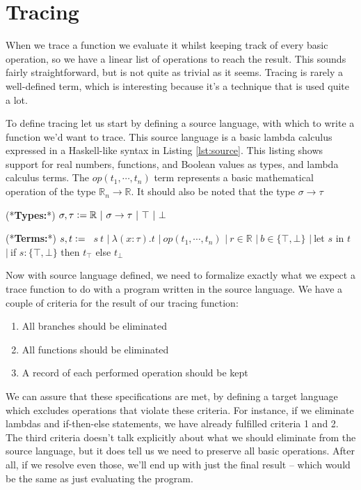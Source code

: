 \section{Tracing}
    When we trace a function we evaluate it whilst keeping track of every basic operation, so we have a linear list of operations to reach the result.
    This sounds fairly straightforward, but is not quite as trivial as it seems.
    Tracing is rarely a well-defined term, which is interesting because it's a technique that is used quite a lot.

    To define tracing let us start by defining a source language, with which to write a function we'd want to trace.
    This source language is a basic lambda calculus expressed in a Haskell-like syntax in Listing \ref{lst:source}.
    This listing shows support for real numbers, functions, and Boolean values as types, and lambda calculus terms.
    The $op(t_1,\dotsb,t_n)$ term represents a basic mathematical operation of the type $\mathbb{R}_n\to\mathbb{R}$.
    It should also be noted that the type $\sigma\to\tau$

    \begin{deflisting}[caption={Source language},label=lst:source]
    (*\textbf{Types:}*)
        $\sigma,\tau\deq\mathbb{R}\ |\ \sigma\to\tau\ |\ \top\ |\ \bot$

    (*\textbf{Terms:}*)
        $s,t\deq$
        $\ \ s\ t$
        $|\ \lambda(x:\tau).t$
        $|\ op(t_1,\dotsb,t_n)$
        $|\ r\in\mathbb{R}$
        $|\ b\in\{\top,\bot\}$
        $|\ $let $s$ in $t$
        $|\ $if $s:\{\top,\bot\}$ then $t_\top$ else $t_\bot$
    \end{deflisting}

    Now with source language defined, we need to formalize exactly what we expect a trace function to do with a program written in the source language.
    We have a couple of criteria for the result of our tracing function:
    \begin{enumerate}
        \item All branches should be eliminated
        \item All functions should be eliminated
        \item A record of each performed operation should be kept
    \end{enumerate}
    We can assure that these specifications are met, by defining a target language which excludes operations that violate these criteria.
    For instance, if we eliminate lambdas and if-then-else statements, we have already fulfilled criteria 1 and 2.
    The third criteria doesn't talk explicitly about what we should eliminate from the source language, but it does tell us we need to preserve all basic operations.
    After all, if we resolve even those, we'll end up with just the final result -- which would be the same as just evaluating the program.

